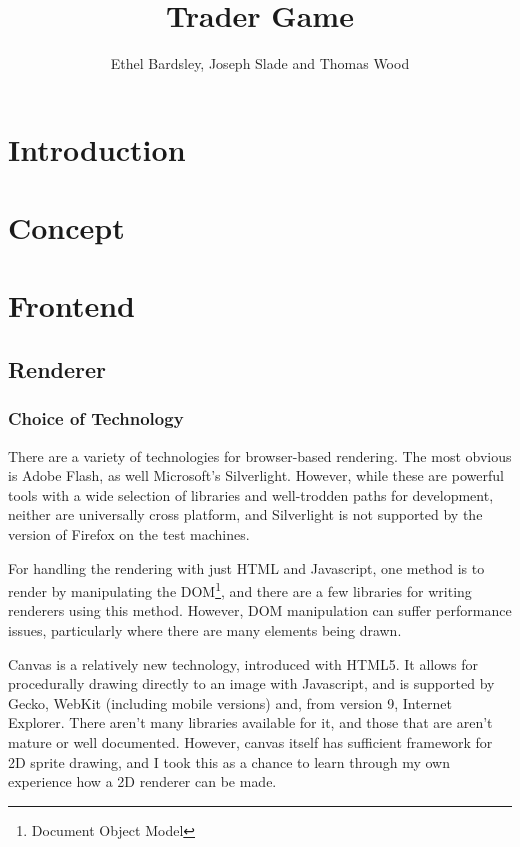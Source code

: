 \documentclass[12pt]{amsart}
\title{Trader Game}
\author{Ethel Bardsley, Joseph Slade and Thomas Wood}
\begin{document}
\maketitle

\section{Introduction}
\section{Concept}
\section{Frontend}
  \subsection{Renderer}
    \subsubsection{Choice of Technology}
      \begin{flushleft}
        There are a variety of technologies for browser-based rendering. The
        most obvious is Adobe Flash, as well Microsoft's Silverlight. However,
        while these are powerful tools with a wide selection of libraries and
        well-trodden paths for development, neither are universally cross
        platform, and Silverlight is not supported by the version of Firefox
        on the test machines.

        For handling the rendering with just HTML and Javascript, one method is
        to render by manipulating the DOM\footnote{Document Object Model}, and
        there are a few libraries for writing renderers using this method.
        However, DOM manipulation can suffer performance issues, particularly
        where there are many elements being drawn.

        Canvas is a relatively new technology, introduced with HTML5. It allows
        for procedurally drawing directly to an image with Javascript, and is
        supported by Gecko, WebKit (including mobile versions) and, from version
        9, Internet Explorer. There aren't many libraries available for it, and
        those that are aren't mature or well documented. However, canvas itself
        has sufficient framework for 2D sprite drawing, and I took this as a
        chance to learn through my own experience how a 2D renderer can be made.
      \end{flushleft}
\end{document}

